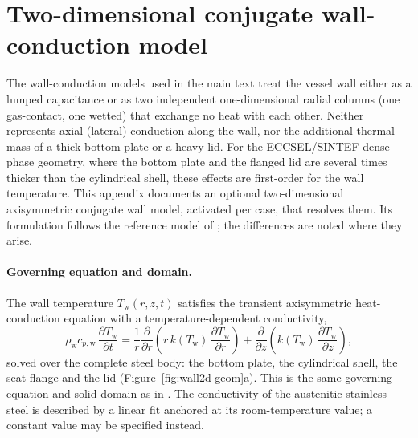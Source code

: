 \documentclass[5p,authoryear]{elsarticle}
\begin{document}
\appendix

\section{Two-dimensional conjugate wall-conduc\-tion model}
\label{app:wall2d}

The wall-conduction models used in the main text treat the vessel wall either as a lumped
capacitance or as two independent one-dimensional radial columns (one gas-contact, one wetted)
that exchange no heat with each other. Neither represents axial (lateral) conduction along the
wall, nor the additional thermal mass of a thick bottom plate or a heavy lid. For the ECCSEL/SINTEF
dense-phase geometry, where the bottom plate and the flanged lid are several times thicker than
the cylindrical shell, these effects are first-order for the wall temperature. This appendix
documents an optional two-dimensional axisymmetric conjugate wall model, activated per case, that
resolves them. Its formulation follows the reference model of \citet{Hoydalsvik2026}; the
differences are noted where they arise.

\paragraph{Governing equation and domain.} The wall temperature $T_\mathrm{w}(r,z,t)$ satisfies
the transient axisymmetric heat-conduction equation with a temperature-dependent conductivity,
\begin{equation}
\rho_\mathrm{w} c_{p,\mathrm{w}}\,\frac{\partial T_\mathrm{w}}{\partial t}
= \frac{1}{r}\frac{\partial}{\partial r}\!\left(r\,k(T_\mathrm{w})\,\frac{\partial T_\mathrm{w}}{\partial r}\right)
+ \frac{\partial}{\partial z}\!\left(k(T_\mathrm{w})\,\frac{\partial T_\mathrm{w}}{\partial z}\right),
\label{eq:wall2d}
\end{equation}
solved over the complete steel body: the bottom plate, the cylindrical shell, the seat flange and
the lid (Figure~\ref{fig:wall2d-geom}a). This is the same governing equation and solid domain as
in \citet{Hoydalsvik2026}. The conductivity of the austenitic stainless steel is described by a
linear fit anchored at its room-temperature value; a constant value may be specified instead.
\end{document}
